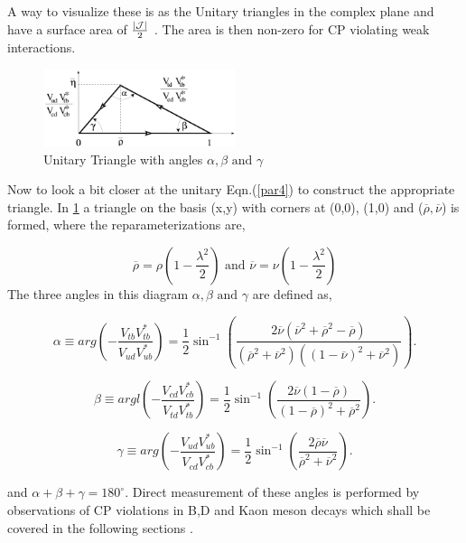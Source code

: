 A way to visualize these is as the Unitary triangles in the complex plane and have a surface area of $\frac{\left|\cal{J}\right|}{2}$ \cite{CKM11}. The area is then non-zero for CP violating weak interactions.

\begin{figure}[h]
\centering
\includegraphics[width=0.5\textwidth]{figs/ckmfig5.jpg}
\caption{Unitary Triangle with angles $\alpha, \beta \mbox{ and } \gamma$}
\label{tri4}
\end{figure}
Now to look a bit closer at the unitary Eqn.(\ref{par4}) to construct the appropriate triangle. In \cref{tri4} a triangle on the basis (x,y) with corners at (0,0), (1,0) and ($\overline{\rho},\overline{\nu}$) is formed, where the reparameterizations are,

\begin{equation}\label{pv1}
\overline{\rho}=\rho\left(1-\frac{\lambda^2}{2}\right) \mbox{ and } \overline{\nu}=\nu\left(1-\frac{\lambda^2}{2}\right)
\end{equation}
The three angles in this diagram $\alpha , \beta \mbox{ and } \gamma$ are defined as,

\begin{equation}\label{ang1}
 \alpha\equiv arg\left(-\frac{V_{tb}V^{*}_{tb}}{V_{ud}V^{*}_{ub}}\right) =\frac{1}{2}\sin^{-1}\left(\frac{2\overline{\nu}(\overline{\nu}^2+\overline{\rho}^2-\overline{\rho})}{(\overline{\rho}^2+\overline{\nu}^2)((1-\overline{\nu})^2+\overline{\nu}^2)}\right) .
\end{equation}

\begin{equation}\label{ang2}
\beta\equiv argl\left(-\frac{V_{cd}V^{*}_{cb}}{V_{td}V^{*}_{tb}}\right) = \frac{1}{2}\sin^{-1}\left(\frac{2\overline{\nu}(1-\overline{\rho})}{(1-\overline{\rho})^2+\overline{\rho}^2}\right).
\end{equation}

\begin{equation}\label{ang3}
\gamma\equiv arg\left(-\frac{V_{ud}V^{*}_{ub}}{V_{cd}V^{*}_{cb}}\right) = \frac{1}{2}\sin^{-1}\left(\frac{2\overline{\rho}\overline{\nu}}{\overline{\rho}^2+\overline{\nu}^2}\right).
\end{equation}

and $\alpha + \beta + \gamma = 180^{\circ}$. Direct measurement of these angles is performed by observations of CP violations in B,D and Kaon meson decays which shall be covered in the following sections \cite{CKM7}.
